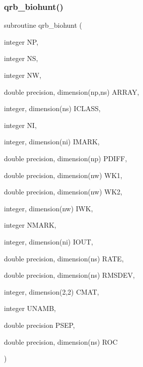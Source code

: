 \subsubsection{\texorpdfstring{qrb\+\_\+biohunt()}{qrb\_biohunt()}}
{\footnotesize\ttfamily subroutine qrb\+\_\+biohunt (\begin{DoxyParamCaption}\item[{integer}]{NP,  }\item[{integer}]{NS,  }\item[{integer}]{NW,  }\item[{double precision, dimension(np,ns)}]{A\+R\+R\+AY,  }\item[{integer, dimension(ns)}]{I\+C\+L\+A\+SS,  }\item[{integer}]{NI,  }\item[{integer, dimension(ni)}]{I\+M\+A\+RK,  }\item[{double precision, dimension(np)}]{P\+D\+I\+FF,  }\item[{double precision, dimension(nw)}]{W\+K1,  }\item[{double precision, dimension(nw)}]{W\+K2,  }\item[{integer, dimension(nw)}]{I\+WK,  }\item[{integer}]{N\+M\+A\+RK,  }\item[{integer, dimension(ni)}]{I\+O\+UT,  }\item[{double precision, dimension(ns)}]{R\+A\+TE,  }\item[{double precision, dimension(ns)}]{R\+M\+S\+D\+EV,  }\item[{integer, dimension(2,2)}]{C\+M\+AT,  }\item[{integer}]{U\+N\+A\+MB,  }\item[{double precision}]{P\+S\+EP,  }\item[{double precision, dimension(ns)}]{R\+OC }\end{DoxyParamCaption})}

